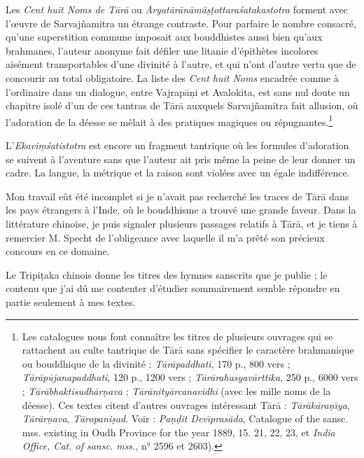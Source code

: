 \documentclass[a4paper, 11pt, oneside, french]{article}
\begin{document}
Les \emph{Cent huit Noms de T\={a}r\={a}} ou \emph{\={A}ryat\={a}r\={a}n\={a}m\={a}\d{s}\d{t}ottara\'{s}atakastotra} forment avec l'œuvre de Sarvaj\~{n}amitra un étrange contraste. Pour parfaire le nombre consacré, qu'une superstition commune imposait aux bouddhistes aussi bien qu'aux brahmanes, l'auteur anonyme fait défiler une litanie d'épithètes incolores aisément transportables d'une divinité à l'autre, et qui n'ont d'autre vertu que de concourir au total obligatoire. La liste des \emph{Cent huit Noms} encadrée comme à l'ordinaire dans un dialogue, entre Vajrap\={a}\d{n}i et Avalokita, est sans nul doute un chapitre isolé d'un de ces tantras de T\={a}r\={a} auxquels Sarvaj\~{n}amitra fait allusion, où l'adoration de la déesse se mêlait à des pratiques magiques ou répugnantes.\footnote{Les catalogues nous font connaître les titres de plusieurs ouvrages qui se rattachent au culte tantrique de T\={a}r\={a} sans spécifier le caractère brahmanique ou bouddhique de la divinité : \emph{T\={a}r\={a}paddhati}, 170 p., 800 vers ; \emph{T\={a}r\={a}p\={u}janapaddhati}, 120 p., 1200 vers ; \emph{T\={a}r\={a}rahasyav\={a}rttika}, 250 p., 6000 vers ; \emph{T\={a}r\={a}bhaktisudh\={a}r\d{n}ava} ; \emph{T\={a}r\={a}nity\={a}rcanavidhi} (avec les mille noms de la déesse). Ces textes citent d'autres ouvrages intéressant T\={a}r\={a} : \emph{T\={a}r\={a}k\={a}ra\d{n}\={\i}ya}, \emph{T\={a}r\={a}r\d{n}ava}, \emph{T\={a}ropani\d{s}ad}. Voir : \emph{Pa\d{n}\d{d}it Dev\={\i}pras\={a}da}, Catalogue of the sansc. mss. existing in Oudh Province for the year 1889, 15. 21, 22, 23, et \emph{India Office, Cat. of sansc. mss.}, n° 2596 et 2603).}

L'\emph{Ekavi\d{m}\'{s}atistotra} est encore un fragment tantrique où les formules d'adoration se suivent à l'aventure sans que l'auteur ait pris même la peine de leur donner un cadre. La langue, la métrique et la raison sont violées avec un égale indifférence.

Mon travail eût été incomplet si je n'avait pas recherché les traces de T\={a}r\={a} dans les pays étrangers à l'Inde, où le bouddhisme a trouvé une grande faveur. Dans la littérature chinoise, je puis signaler plusieurs passages relatifs à T\={a}r\={a}, et je tiens à remercier M. Specht de l'obligeance avec laquelle il m'a prêté son précieux concours en ce domaine.

Le Tripi\d{t}aka chinois donne les titres des hymnes sanscrits que je publie ; le contenu que j'ai dû me contenter d'étudier sommairement semble répondre en partie seulement à mes textes.
\end{document}
